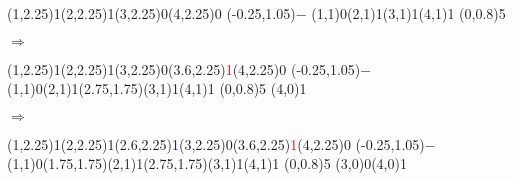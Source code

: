 \documentclass[11pt,a4paper]{article}
\begin{document}
\begin{center}

\begin{table}[ht!]
  \centering
  \begin{minipage}{0.15\textwidth}

\par\vspace{3\oplineheight}
\oplput(1,2.25){1}\oplput(2,2.25){1}\oplput(3,2.25){0}\oplput(4,2.25){0}
\oplput(-0.25,1.05){$-$}
\oplput(1,1){0}\oplput(2,1){1}\oplput(3,1){1}\oplput(4,1){1}
\ophline(0,0.8){5}

  \end{minipage}
  \hfillx
  \begin{minipage}{0.1\textwidth}
  \centering

$ \Rightarrow $

  \end{minipage}
  \hfillx
  \begin{minipage}{0.15\textwidth}

\par\vspace{3\oplineheight}
\oplput(1,2.25){1}\oplput(2,2.25){1}\oplput(3,2.25){0}\oplput(3.6,2.25){\scriptsize \textcolor{red}{1}}\oplput(4,2.25){0}
\oplput(-0.25,1.05){$-$}
\oplput(1,1){0}\oplput(2,1){1}\oplput(2.75,1.75){\tiny \textcolor{red}{}}\oplput(3,1){1}\oplput(4,1){1}
\ophline(0,0.8){5}
\oplput(4,0){1}

  \end{minipage}
  \hfillx
  \begin{minipage}{0.1\textwidth}
  \centering

$ \Rightarrow $

  \end{minipage}
  \hfillx
  \begin{minipage}{0.15\textwidth}

\par\vspace{3\oplineheight}
\oplput(1,2.25){1}\oplput(2,2.25){1}\oplput(2.6,2.25){\scriptsize \textcolor{blue}{1}}\oplput(3,2.25){0}\oplput(3.6,2.25){\scriptsize \textcolor{red}{1}}\oplput(4,2.25){0}
\oplput(-0.25,1.05){$-$}
\oplput(1,1){0}\oplput(1.75,1.75){\tiny \textcolor{blue}{}}\oplput(2,1){1}\oplput(2.75,1.75){\tiny \textcolor{red}{}}\oplput(3,1){1}\oplput(4,1){1}
\ophline(0,0.8){5}
\oplput(3,0){0}\oplput(4,0){1}


\end{minipage}
\end{table}
\end{center}
\end{document}
